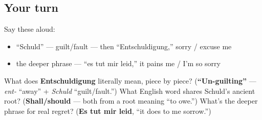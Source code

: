 \subsection*{Your turn}
Say these aloud:

\begin{itemize}
\raggedright
  \item \textquotedblleft{}Schuld\textquotedblright{} — guilt/fault — then \textquotedblleft{}Entschuldigung,\textquotedblright{} sorry / excuse me
  \item the deeper phrase — \textquotedblleft{}es tut mir leid,\textquotedblright{} it pains me / I'm so sorry
\end{itemize}

\begin{tcolorbox}[breakable,colback=teal!4,colframe=teal!35!black,title={Before you move on}]
What does \textbf{Entschuldigung} literally mean, piece by piece? (\textbf{\textquotedblleft{}Un-guilting\textquotedblright{}} — \emph{ent-} \textquotedblleft{}away\textquotedblright{} + \emph{Schuld} \textquotedblleft{}guilt/fault.\textquotedblright{}) What English word shares Schuld's ancient root? (\textbf{Shall/should} — both from a root meaning \textquotedblleft{}to owe.\textquotedblright{}) What's the deeper phrase for real regret? (\textbf{Es tut mir leid}, \textquotedblleft{}it does to me sorrow.\textquotedblright{})
\end{tcolorbox}
